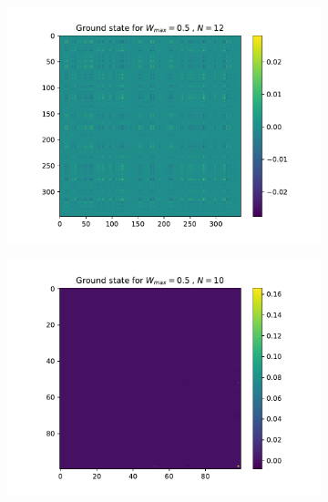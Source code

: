 \documentclass[reprint,amsmath,amssymb,aps,prb]{revtex4-2}
\begin{document}
\begin{figure}[h!]
\begin{subfigure}[c]{0.3\textwidth}
		\includegraphics[width=\textwidth]{../results/N12_trainingset_groundstate_Wmax0.5.pdf}
	\end{subfigure}
	\begin{subfigure}[c]{0.3\textwidth}
		\includegraphics[width=\textwidth]{../results/N10_trainingset_groundstate_Wmax8.0.pdf}
	\end{subfigure}
	\begin{subfigure}[c]{0.3\textwidth}

\end{subfigure}
\end{figure}
\end{document}
